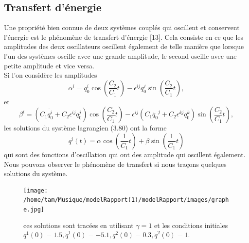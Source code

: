 \documentclass[12pt,a4paper, openany]{report}
\begin{document}
\subsection{Transfert d'énergie}
Une propriété bien connue de deux systèmes couplés qui oscillent et conservent l'énergie est le phénomène de transfert d'énergie [13]. Cela consiste en ce que les amplitudes des deux oscillateurs oscillent également de telle manière que lorsque l'un des systèmes oscille avec une grande amplitude, le second oscille avec une petite amplitude et vice versa.\\ Si l'on considère les amplitudes 
\begin{equation}
	\alpha^i=q_0^i\cos\left(\frac{C_2}{C_1}t\right)-\epsilon^{ij}q_0^j\sin\left(\frac{C_2}{C_1}t\right) ,	
\end{equation}
et 
\begin{equation}
	\beta^i=\left(C_1\dot{q^i_0}+C_2\epsilon^{ij}q^j_0\right)\cos\left(\frac{C_2}{C_1}t\right)-\epsilon^{ij}\left(C_1\dot{q_0}^j+C_2\epsilon^{kj}q^k_0\right)\sin\left(\frac{C_2}{C_1}t\right),
\end{equation} les solutions du système lagrangien (3.80) ont la forme 
\begin{equation}
	q^i(t)=\alpha\cos\left(\frac{1}{C_1}t\right)+\beta\sin\left(\frac{1}{C_1}t\right)
\end{equation}
qui sont des fonctions d'oscillation qui ont des amplitude qui oscillent également.\\ Nous pouvons observer le phénomène de transfert si nous traçons quelques solutions du système.

\begin{figure}[h]
	\centering
	\texttt{[image: /home/tam/Musique/modelRapport(1)/modelRapport/images/graphe.jpg]}
	\caption{ces solutions sont tracées en utilisant $\gamma =1$ et les conditions initiales $q^1(0)=1.5 ,\dot{q}^1(0)=-5.1 ,q^2(0)=0.3 ,\dot{q}^2(0)=1$.}
	\label{fig:hannay}
\end{figure}
\end{document}
